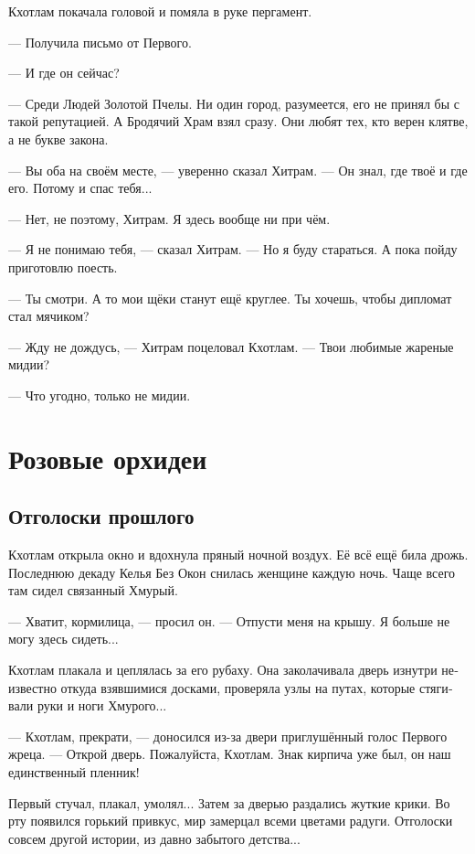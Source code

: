 \documentclass[a4paper,12pt,fleqn]{book}\usepackage{cooltooltips}\usepackage{polyglossia}\setdefaultlanguage[babelshorthands=true]{russian}\setotherlanguage{english}\defaultfontfeatures{Ligatures=TeX,Mapping=tex-text} \usepackage{xcolor}\definecolor{lightgray}{HTML}{bbbbbb}\color{lightgray}\newcommand{\ml}[3]{\textenglish{\textcolor{black}{#3}} }
\begin{document}
Кхотлам покачала головой и помяла в руке пергамент.

--- Получила письмо от Первого.

--- И где он сейчас?

--- Среди Людей Золотой Пчелы.
Ни один город, разумеется, его не принял бы с такой репутацией.
А Бродячий Храм взял сразу.
Они любят тех, кто верен клятве, а не букве закона.

--- Вы оба на своём месте, --- уверенно сказал Хитрам.
--- Он знал, где твоё и где его.
Потому и спас тебя...

--- Нет, не поэтому, Хитрам.
Я здесь вообще ни при чём.

--- Я не понимаю тебя, --- сказал Хитрам.
--- Но я буду стараться.
А пока пойду приготовлю поесть.

--- Ты смотри.
А то мои щёки станут ещё круглее.
Ты хочешь, чтобы дипломат стал мячиком?

--- Жду не дождусь, --- Хитрам поцеловал Кхотлам.
--- Твои любимые жареные мидии?

--- Что угодно, только не мидии.

\chapter{Розовые орхидеи}

\section{Отголоски прошлого}

Кхотлам открыла окно и вдохнула пряный ночной воздух.
Её всё ещё била дрожь.
Последнюю декаду Келья Без Окон снилась женщине каждую ночь.
Чаще всего там сидел связанный Хмурый.

--- Хватит, кормилица, --- просил он.
--- Отпусти меня на крышу.
Я больше не могу здесь сидеть...

Кхотлам плакала и цеплялась за его рубаху.
Она заколачивала дверь изнутри неизвестно откуда взявшимися досками, проверяла узлы на путах, которые стягивали руки и ноги Хмурого...

--- Кхотлам, прекрати, --- доносился из-за двери приглушённый голос Первого жреца.
--- Открой дверь.
Пожалуйста, Кхотлам.
Знак кирпича уже был, он наш единственный пленник!

Первый стучал, плакал, умолял...
Затем за дверью раздались жуткие крики.
Во рту появился горький привкус, мир замерцал всеми цветами радуги.
Отголоски совсем другой истории, из давно забытого детства...
\end{document}
